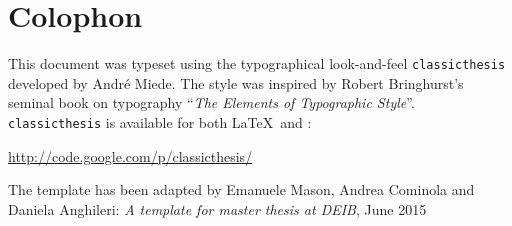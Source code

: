 \thispagestyle{empty}

\hfill

\vfill

\section*{Colophon}
This document was typeset using the typographical look-and-feel \texttt{classicthesis} developed by Andr\'e Miede.
The style was inspired by Robert Bringhurst's seminal book on typography ``\emph{The Elements of Typographic Style}''.
\texttt{classicthesis} is available for both \LaTeX\ and \mLyX: 
\begin{center}
\url{http://code.google.com/p/classicthesis/}
\end{center}
The template has been adapted by Emanuele Mason, Andrea Cominola and Daniela Anghileri:
\textit{A template for master thesis at DEIB},
June 2015
 
\bigskip

\medskip

\noindent\finalVersionString